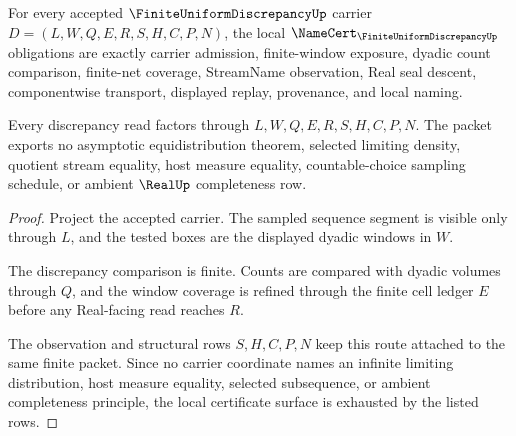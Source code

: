 \begin{theorem}
\label{thm:finite-uniform-discrepancy-namecert-obligations}
For every accepted $\FiniteUniformDiscrepancyUp$ carrier $D=(L,W,Q,E,R,S,H,C,P,N)$, the local $\NameCert_{\FiniteUniformDiscrepancyUp}$ obligations are exactly carrier admission, finite-window exposure, dyadic count comparison, finite-net coverage, StreamName observation, Real seal descent, componentwise transport, displayed replay, provenance, and local naming.

Every discrepancy read factors through $L,W,Q,E,R,S,H,C,P,N$. The packet exports no asymptotic equidistribution theorem, selected limiting density, quotient stream equality, host measure equality, countable-choice sampling schedule, or ambient $\RealUp$ completeness row.
\end{theorem}
\begin{proof}
Project the accepted carrier. The sampled sequence segment is visible only through $L$, and the tested boxes are the displayed dyadic windows in $W$.

The discrepancy comparison is finite. Counts are compared with dyadic volumes through $Q$, and the window coverage is refined through the finite cell ledger $E$ before any Real-facing read reaches $R$.

The observation and structural rows $S,H,C,P,N$ keep this route attached to the same finite packet. Since no carrier coordinate names an infinite limiting distribution, host measure equality, selected subsequence, or ambient completeness principle, the local certificate surface is exhausted by the listed rows.
\end{proof}

